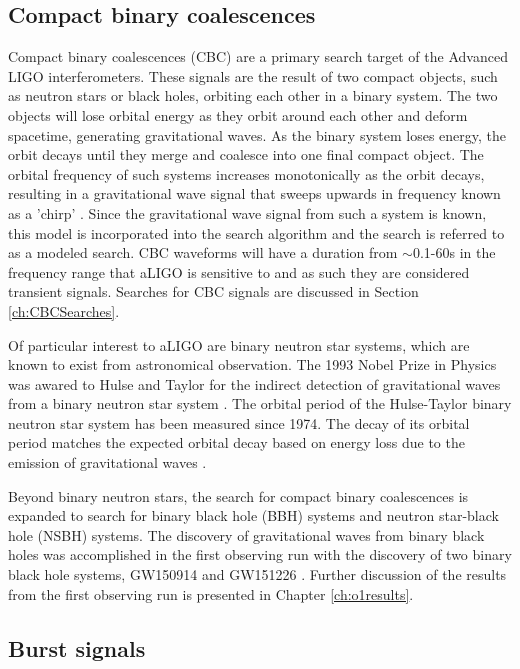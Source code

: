 \subsection{Compact binary coalescences}

Compact binary coalescences (CBC) are a primary search target of the 
Advanced LIGO interferometers. These signals are the result of two 
compact objects, such as neutron stars or black holes, orbiting each 
other in a binary 
system. The two objects will lose orbital energy as they orbit around each other 
and deform spacetime, generating gravitational waves. As the binary 
system loses energy, the orbit decays until they merge and coalesce 
into one final 
compact object. The orbital frequency of such systems increases 
monotonically as the orbit decays, resulting in a gravitational 
wave signal that sweeps upwards in frequency known as a 'chirp' 
\cite{GW150914-CBC}. 
Since the gravitational wave signal from such a system is known, 
this model is incorporated into the search algorithm and the 
search is referred to as a modeled search. CBC waveforms will 
have a duration from $\sim$0.1-60s in the frequency range that
aLIGO is sensitive to and as such they are considered transient 
signals. Searches for CBC 
signals are discussed in Section \ref{ch:CBCSearches}.

Of particular interest to aLIGO are binary neutron star systems, 
which are known to exist from astronomical 
observation. The 1993 Nobel Prize in Physics was awared to Hulse and 
Taylor for the indirect detection of gravitational waves from a binary 
neutron star system \cite{Taylor:1982,Hulse:1994}. The orbital 
period of the Hulse-Taylor binary neutron star system has been measured 
since 1974. The decay of its orbital period matches the 
expected orbital decay based on energy loss due to the emission of 
gravitational waves \cite{Taylor:1989}. 

Beyond binary neutron stars, the search for compact binary coalescences 
is expanded to search for binary black hole (BBH) systems and neutron star-black 
hole (NSBH) systems. The discovery of gravitational waves from binary black holes 
was accomplished in the 
first observing run with the discovery of two binary black hole systems, GW150914 
and GW151226 \cite{O1:BBH}. Further discussion of the results from the first 
observing run is 
presented in Chapter \ref{ch:o1results}.

\subsection{Burst signals}

